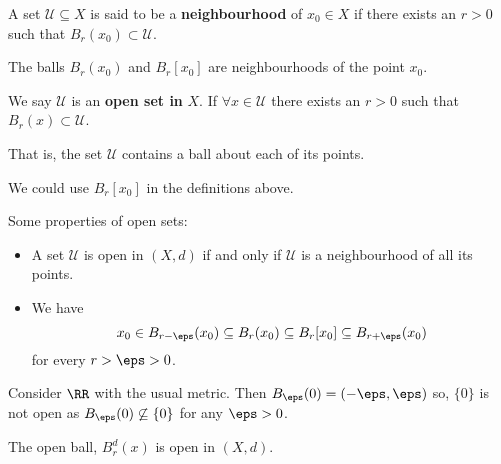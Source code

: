 \documentclass[12pt, a4paper]{article}
\begin{document}
\begin{definition}
    A set \(\mathcal{U} \subseteq X\) is said to be a \textbf{neighbourhood} of \(x_0 \in X\) if there exists an \(r>0\) such that \(B_r(x_0) \subset \mathcal{U}\).
\end{definition}

\begin{example}
    The balls \(B_r(x_0)\) and \(B_r[x_0]\) are neighbourhoods of the point \(x_0\).
\end{example}

\begin{definition}
    We say \(\mathcal{U}\) is an \textbf{open set in} \(X\). If \(\forall x \in \mathcal{U}\) there exists an \(r>0\) such that \(B_r(x) \subset \mathcal{U}\).
\end{definition}

\begin{mdnote}
    That is, the set \(\mathcal{U}\) contains a ball about each of its points.
\end{mdnote}

\begin{mdremark}
    We could use \(B_r[x_0]\) in the definitions above.
\end{mdremark}

\begin{theorem}
    Some properties of open sets:
    \begin{itemize}
        \item A set \(\mathcal{U}\) is open in \((X,d)\) if and only if \(\mathcal{U}\) is a neighbourhood of all its points.
        \item We have 
        \[x_0 \in B_{r-\eps}(x_0) \subseteq B_r(x_0) \subseteq B_r[x_0] \subseteq B_{r+\eps}(x_0)\]
        for every \(r>\eps>0\).
    \end{itemize}
\end{theorem}

\begin{example}
    Consider \(\RR\) with the usual metric. Then \(B_{\eps}(0)=(-\eps,\eps)\) so, \(\{0\}\) is not open as \(B_{\eps}(0) \not\subseteq \{0\}\) for any \(\eps>0\).
\end{example}

\begin{lemma}
    The open ball, \(B_r^d(x)\) is open in \((X,d)\).
\end{lemma}
\end{document}
